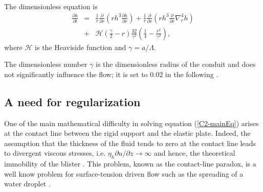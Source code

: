 The dimensionless equation is
\begin{eqnarray}
  \frac{\partial h}{\partial t}& =&\frac{1}{ r}
                                    \frac{\partial}{\partial r}  \left( rh^3  \frac{\partial h}{\partial
                                    r}\right)+\frac{1}{ r} \frac{\partial}{\partial r}\left( rh^3
                                    \frac{\partial}{\partial
                                    r}\nabla_r^4h\right)\nonumber\\
                               &+&
                                   \mathcal{H}(\frac{\gamma}{2}-r)\frac{32}{\gamma^{2}}\left(\frac{1}{4}-\frac{r^{2}}{\gamma^{2}}\right),
                                   \label{C2-mainEq}
\end{eqnarray}
where $\mathcal{H}$ is the Heaviside function and $\gamma=a/\Lambda$.

The dimensionless number  $\gamma$ is the dimensionless  radius of the
conduit and  does not significantly influence  the flow; it is  set to
$0.02$ in the following \citep{Michaut:2009jx,Michaut:2011kg}.
	 
\subsection{A need for regularization}
\label{C2-sec:need-regularization}

One  of   the  main   mathematical  difficulty  in   solving  equation
(\ref{C2-mainEq}) arises at the contact line between the rigid support
and the elastic  plate.  Indeed, the assumption that  the thickness of
the fluid tends to zero at the contact line leads to divergent viscous
stresses, i.e.   $\eta_h \partial u/\partial z\rightarrow  \infty$ and
hence,     the    theoretical     immobility     of    the     blister
\citep{Flitton:1999iv,Lister:2013ia,Anonymous:QWXp_4JV}. This problem,
known  as  the  contact-line  paradox,  is a  well  know  problem  for
surface-tension driven flow  such as the spreading of  a water droplet
\citep{Bertozzi:1998wz,Snoeijer:2013cm}.

